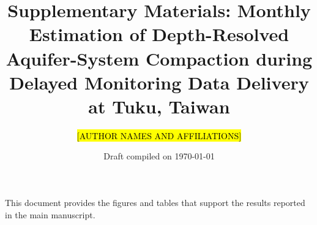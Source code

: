 \documentclass[12pt,oneside]{article}
\newcommand{\placeholder}[1]{\begingroup\sethlcolor{yellow}\hl{[#1]}\endgroup}
\begin{document}
\title{\textbf{Supplementary Materials: Monthly Estimation of Depth-Resolved Aquifer-System Compaction during Delayed Monitoring Data Delivery at Tuku, Taiwan}}
\author{\placeholder{AUTHOR NAMES AND AFFILIATIONS}}
\date{Draft compiled on \today}
\maketitle

This document provides the figures and tables that support the results reported in the main manuscript.




\end{document}
